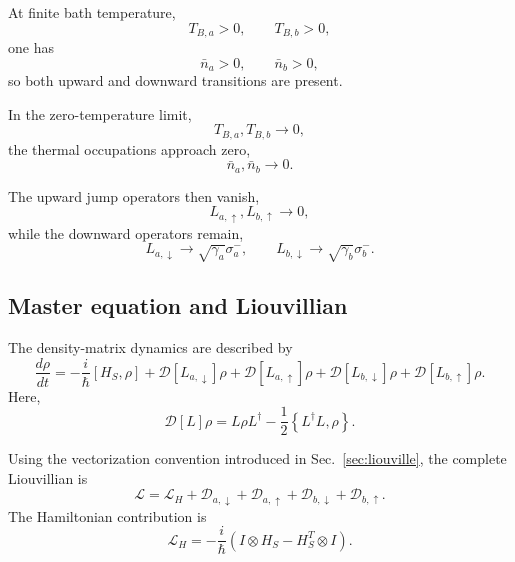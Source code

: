 \documentclass[11pt]{article}
\begin{document}
At finite bath temperature,
%
\begin{equation}
T_{B,a}>0,
\qquad
T_{B,b}>0,
\end{equation}
%
one has
%
\begin{equation}
\bar{n}_a>0,
\qquad
\bar{n}_b>0,
\end{equation}
%
so both upward and downward transitions are present.

In the zero-temperature limit,
%
\begin{equation}
T_{B,a},T_{B,b}\rightarrow0,
\end{equation}
%
the thermal occupations approach zero,
%
\begin{equation}
\bar{n}_a,\bar{n}_b\rightarrow0.
\end{equation}

The upward jump operators then vanish,
%
\begin{equation}
L_{a,\uparrow},
L_{b,\uparrow}
\rightarrow0,
\end{equation}
%
while the downward operators remain,
%
\begin{equation}
L_{a,\downarrow}
\rightarrow
\sqrt{\gamma_a}\sigma_a^-,
\qquad
L_{b,\downarrow}
\rightarrow
\sqrt{\gamma_b}\sigma_b^-.
\end{equation}


\subsection{Master equation and Liouvillian}

The density-matrix dynamics are described by
%
\begin{equation}
\boxed{
\frac{d\rho}{dt}
=
-\frac{i}{\hbar}
[H_S,\rho]
+
\mathcal{D}[L_{a,\downarrow}]\rho
+
\mathcal{D}[L_{a,\uparrow}]\rho
+
\mathcal{D}[L_{b,\downarrow}]\rho
+
\mathcal{D}[L_{b,\uparrow}]\rho .
}
\label{eq:dimer_master_equation}
\end{equation}
%
Here,
%
\begin{equation}
\mathcal{D}[L]\rho
=
L\rho L^\dagger
-
\frac{1}{2}
\left\{
L^\dagger L,\rho
\right\}.
\end{equation}

Using the vectorization convention introduced in
Sec.~\ref{sec:liouville}, the complete Liouvillian is
%
\begin{equation}
\boxed{
\mathcal{L}
=
\mathcal{L}_H
+
\mathcal{D}_{a,\downarrow}
+
\mathcal{D}_{a,\uparrow}
+
\mathcal{D}_{b,\downarrow}
+
\mathcal{D}_{b,\uparrow}.
}
\label{eq:dimer_liouvillian}
\end{equation}
%
The Hamiltonian contribution is
%
\begin{equation}
\mathcal{L}_H
=
-\frac{i}{\hbar}
\left(
I\otimes H_S
-
H_S^T\otimes I
\right).
\end{equation}
\end{document}
